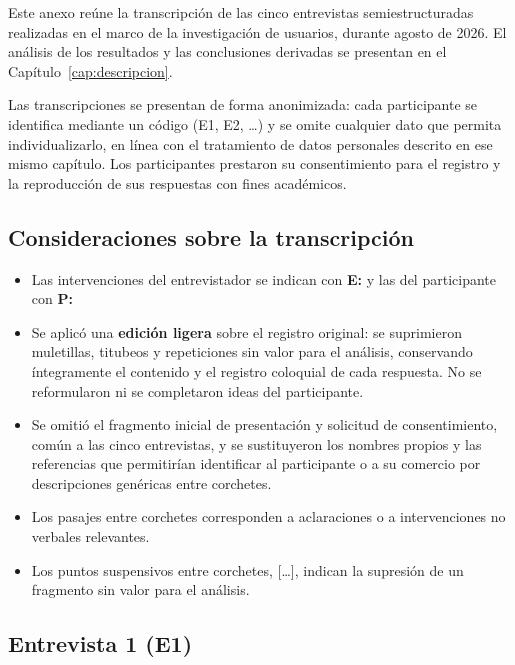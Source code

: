 \label{anexo:entrevistas}

{\color{nuevo}
Este anexo reúne la transcripción de las cinco entrevistas semiestructuradas realizadas en el marco de la investigación de usuarios, durante agosto de 2026. El análisis de los resultados y las conclusiones derivadas se presentan en el Capítulo~\ref{cap:descripcion}.

Las transcripciones se presentan de forma anonimizada: cada participante se identifica mediante un código (E1, E2, \ldots) y se omite cualquier dato que permita individualizarlo, en línea con el tratamiento de datos personales descrito en ese mismo capítulo. Los participantes prestaron su consentimiento para el registro y la reproducción de sus respuestas con fines académicos.

\subsection*{Consideraciones sobre la transcripción}

\begin{itemize}[leftmargin=2em]
    \item Las intervenciones del entrevistador se indican con \textbf{E:} y las del participante con \textbf{P:}
    \item Se aplicó una \textbf{edición ligera} sobre el registro original: se suprimieron muletillas, titubeos y repeticiones sin valor para el análisis, conservando íntegramente el contenido y el registro coloquial de cada respuesta. No se reformularon ni se completaron ideas del participante.
    \item Se omitió el fragmento inicial de presentación y solicitud de consentimiento, común a las cinco entrevistas, y se sustituyeron los nombres propios y las referencias que permitirían identificar al participante o a su comercio por descripciones genéricas entre corchetes.
    \item Los pasajes entre corchetes corresponden a aclaraciones o a intervenciones no verbales relevantes.
    \item Los puntos suspensivos entre corchetes, \mbox{[\ldots]}, indican la supresión de un fragmento sin valor para el análisis.
\end{itemize}

\subsection*{Entrevista 1 (E1)}

}
